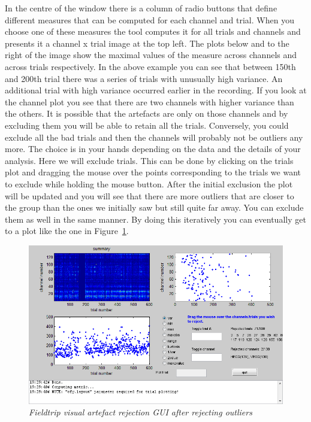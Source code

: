 In the centre of the window there is a column of radio buttons that define different measures that can be computed for each channel and trial. When you choose one of these measures the tool computes it for all trials and channels and presents it a channel x trial image at the top left. The plots below and to the right of the image show the maximal values of the measure across channels and across trials respectively. In the above example you can see that between 150th and 200th trial there was a series of trials with unusually high variance. An additional trial with high variance occurred earlier in the recording. If you look at the channel plot you see that there are two channels with higher variance than the others. It is possible that the artefacts are only on those channels and by excluding them you will be able to retain all the trials. Conversely, you could exclude all the bad trials and then the channels will probably not be outliers any more. The choice is in your hands depending on the data and the details of your analysis. Here we will exclude trials. This can be done by clicking on the trials plot and dragging the mouse over the points corresponding to the trials we want to exclude while holding the mouse button. After the initial exclusion the plot will be updated and you will see that there are more outliers that are closer to the group than the ones we initially saw but still quite far away. You can exclude them as well in the same manner. By doing this iteratively you can eventually get to a plot like the one in Figure~\ref{artefact_fig6}.

\begin{figure}
\begin{center}
\includegraphics[width=140mm]{meeg_artefact/figure6}
\caption{\em Fieldtrip visual artefact rejection GUI after rejecting outliers\label{artefact_fig6}}
\end{center}
\end{figure}

